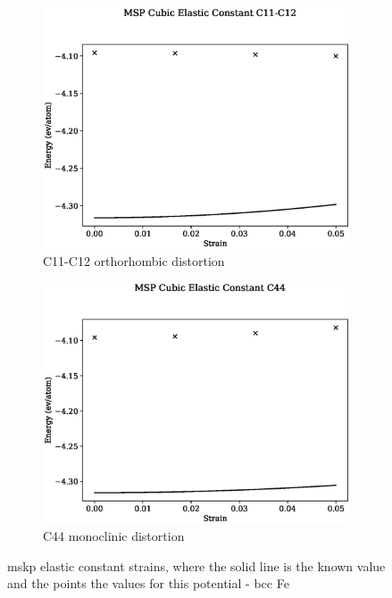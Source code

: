 \begin{figure}[htb]
\begin{subfigure}{.42\textwidth}
  \centering
  \includegraphics[width=.90\linewidth]{chapters/potentials_fe_pd_ru/fepd_potential/ec_mskp/msp_c11_c12_plot_bp_0.eps}  
  \caption{C11-C12 orthorhombic distortion}
  \label{fig:fepd-fefcc-c11c12}
\end{subfigure}
\begin{subfigure}{.42\textwidth}
  \centering
  \includegraphics[width=.90\linewidth]{chapters/potentials_fe_pd_ru/fepd_potential/ec_mskp/msp_c44_plot_bp_0.eps}  
  \caption{C44 monoclinic distortion}
  \label{fig:fepd-fefcc-c44}
\end{subfigure}
\label{fig:feru-fefcc-c11c12c44}
\caption{\acrshort{mskp} elastic constant strains, where the solid line is the known value and the points the values for this potential - \acrshort{bcc} Fe}
\end{figure}







